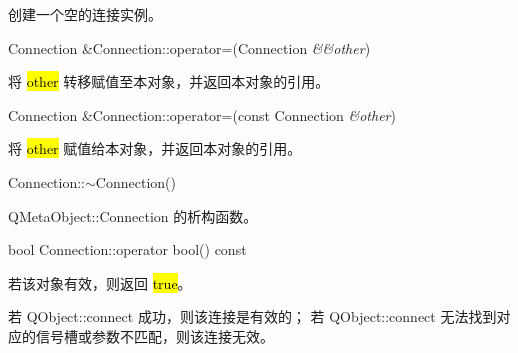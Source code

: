 创建一个空的连接实例。

Connection \&Connection::operator=(Connection \emph{\&\&other})

将 \hl{other} 转移赋值至本对象，并返回本对象的引用。

Connection \&Connection::operator=(const Connection \emph{\&other})

将 \hl{other} 赋值给本对象，并返回本对象的引用。

Connection::$\sim$Connection()

QMetaObject::Connection 的析构函数。

bool Connection::operator bool() const

若该对象有效，则返回 \hl{true}。

若 QObject::connect 成功，则该连接是有效的；
若 QObject::connect 无法找到对应的信号槽或参数不匹配，则该连接无效。